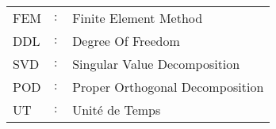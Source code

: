 \begin{bibunit}[ieeetr]
\begin{table}[h!]
\begin{tabular}{p{1cm}p{0.5cm}p{10cm}}
FEM & $:$ & Finite Element Method\\
DDL & $:$ & Degree Of Freedom\\
SVD & $:$ & Singular Value Decomposition\\
POD & $:$ & Proper Orthogonal Decomposition\\
UT & $:$ & Unité de Temps\\

\end{tabular}
\end{table}




\end{bibunit}

 
 
